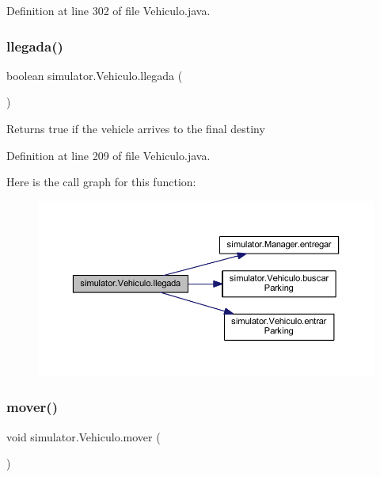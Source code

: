 Definition at line 302 of file Vehiculo.\+java.

\mbox{\label{classsimulator_1_1_vehiculo_a7206f5327c1bb0c7e5ce49d526542740}} 
\subsubsection{\texorpdfstring{llegada()}{llegada()}}
{\footnotesize\ttfamily boolean simulator.\+Vehiculo.\+llegada (\begin{DoxyParamCaption}{ }\end{DoxyParamCaption})}

\begin{DoxyReturn}{Returns}
true if the vehicle arrives to the final destiny 
\end{DoxyReturn}


Definition at line 209 of file Vehiculo.\+java.

Here is the call graph for this function\+:\nopagebreak
\begin{figure}[H]
\begin{center}
\leavevmode
\includegraphics[width=350pt]{classsimulator_1_1_vehiculo_a7206f5327c1bb0c7e5ce49d526542740_cgraph}
\end{center}
\end{figure}
\mbox{\label{classsimulator_1_1_vehiculo_a6180368ea8c35b2e7113a5f2b1368f92}} 
\subsubsection{\texorpdfstring{mover()}{mover()}}
{\footnotesize\ttfamily void simulator.\+Vehiculo.\+mover (\begin{DoxyParamCaption}{ }\end{DoxyParamCaption})}

